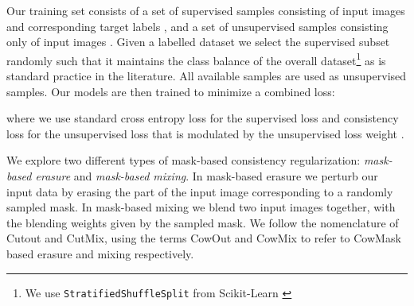 \documentclass{article}
\begin{document}
Our training set consists of a set of supervised samples  consisting of input images  and corresponding target labels , and a set of unsupervised samples  consisting only of input images .
Given a labelled dataset we select the supervised subset randomly such that it maintains the class balance of the overall dataset\footnote{We use \texttt{StratifiedShuffleSplit} from Scikit-Learn \cite{sklearn_api}} as is standard practice in the literature.
All available samples are used as unsupervised samples. Our models  are then trained to minimize a combined loss:

where we use standard cross entropy loss for the supervised loss  and consistency loss for the unsupervised loss  that is modulated by the unsupervised loss weight .

We explore two different types of mask-based consistency regularization: \emph{mask-based erasure} and \emph{mask-based mixing}. In mask-based erasure we perturb our input data by erasing the part of the input image corresponding to a randomly sampled mask. In mask-based mixing we blend two input images together, with the blending weights given by the sampled mask.
We follow the nomenclature of Cutout and CutMix, using the terms CowOut and CowMix to refer to CowMask
based erasure and mixing respectively.
\end{document}

